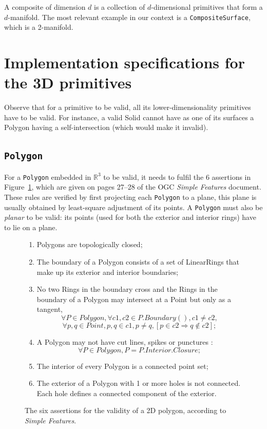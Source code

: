 A composite of dimension $d$ is a collection of $d$-dimensional primitives that form a $d$-manifold. 
The most relevant example in our context is a \texttt{CompositeSurface}, which is a 2-manifold.



%
\section[Implementation specifications]{Implementation specifications for the 3D primitives}


Observe that for a primitive to be valid, all its lower-dimensionality primitives have to be valid.
For instance, a valid Solid cannot have as one of its surfaces a Polygon having a self-intersection (which would make it invalid).


\subsection{\texttt{Polygon}}

For a \texttt{Polygon} embedded in $\mathbb{R}^3$ to be valid, it needs to fulfil the 6 assertions in Figure~\ref{fig:ogcsf_definitions}, which are given on pages 27--28 of the OGC \emph{Simple Features} document.
These rules are verified by first projecting each \texttt{Polygon} to a plane, this plane is usually obtained by least-square adjustment of its points.
A \texttt{Polygon} must also be \emph{planar} to be valid: its points (used for both the exterior and interior rings) have to lie on a plane.
\begin{figure}
  \centering
  \begin{boxedminipage}{.9\textwidth}
    {\small
  \begin{enumerate}
    \item Polygons are topologically closed;
    \item The boundary of a Polygon consists of a set of LinearRings that make up its exterior and interior boundaries;
    \item No two Rings in the boundary cross and the Rings in the boundary of a Polygon may intersect at a Point but only as a tangent, \eg\
      \[
         \forall P \in Polygon, \forall c1, c2 \in P.Boundary(), c1 \neq c2,
      \]
      \[
          \forall p, q \in Point, p, q \in c1, p \neq q, [p \in c2 \Rightarrow q \notin c2];
      \]
    \item A Polygon may not have cut lines, spikes or punctures \eg:
      \[
         \forall P \in Polygon, P = P.Interior.Closure;
      \]
    \item The interior of every Polygon is a connected point set;
    \item The exterior of a Polygon with 1 or more holes is not connected. Each hole defines a connected component of the exterior.
  \end{enumerate}
  }
  \end{boxedminipage}
\caption{The six assertions for the validity of a 2D polygon, according to \emph{Simple Features}.}%
\label{fig:ogcsf_definitions}
\end{figure}



